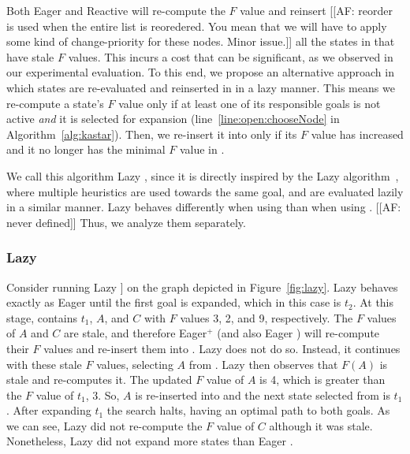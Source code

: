 
Both Eager \kastar and Reactive \kastar will re-compute the $F$ value and reinsert [[AF: reorder is used when the entire list is reoredered. You mean that we will have to apply some kind of change-priority for these nodes. Minor issue.]] all the states in \open that have stale $F$ values.
This incurs a cost that can be significant, as we observed in our experimental evaluation.
To this end, we propose an alternative approach in which states are re-evaluated and reinserted in \open in a lazy manner.
This means we re-compute a state's $F$ value only if at least one of its responsible goals is not active \emph{and} it is selected for expansion (line~\ref{line:open:chooseNode} in Algorithm~\ref{alg:kastar}).
Then, we re-insert it into \open only if its $F$ value has increased and it no longer has the minimal $F$ value in \open.


We call this algorithm Lazy \kastar, since it is directly inspired by the Lazy \astar algorithm~\cite{betzalel2015typeSystem,tolpin2013toward}, where multiple heuristics are used towards the same goal, and are evaluated lazily in a similar manner.
Lazy \kastar behaves differently when using \maxf than when using \minf. [[AF: never defined]]
Thus, we analyze them separately.


\subsubsection{Lazy \kastarmin}

Consider running Lazy \kastarmin [[AF: also never defined]] on the graph depicted in Figure~\ref{fig:lazy}.
Lazy \kastarmin behaves exactly as Eager \kastarmin until the first goal is expanded, which in this case is $t_2$.
At this stage, \open contains $t_1$, $A$, and $C$ with $F$ values 3, 2, and 9, respectively.
The $F$ values of $A$ and $C$ are stale, and therefore Eager$^+$ \kastarmin (and also Eager \kastarmin) will re-compute their $F$ values and re-insert them into \open.
Lazy \kastarmin does not do so.
Instead, it continues with these stale $F$ values, selecting $A$ from \open.
Lazy \kastarmin then observes that $F(A)$ is stale and re-computes it.
The updated $F$ value of $A$ is 4, which is greater than the $F$ value of $t_1$, 3.
So, $A$ is re-inserted into \open and the next state selected from \open is $t_1$.
After expanding $t_1$ the search halts, having an optimal path to both goals.
As we can see, Lazy \kastarmin did not re-compute the $F$ value of $C$ although it was stale.
Nonetheless, Lazy \kastarmin did not expand more states than Eager \kastarmin.

